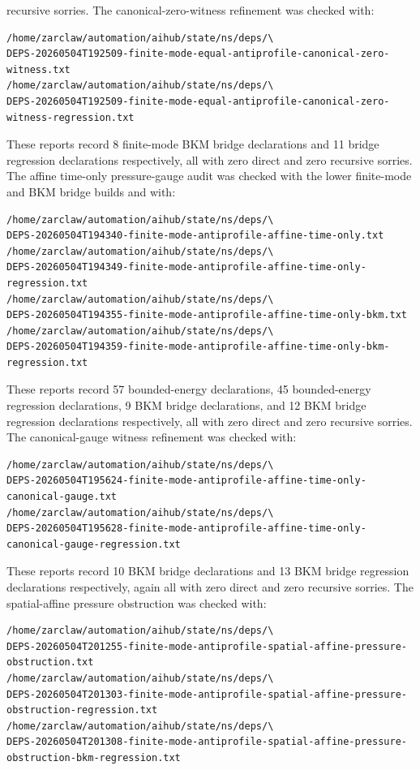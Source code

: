 \documentclass[11pt]{article}
\begin{document}
recursive sorries.
The canonical-zero-witness refinement was checked with:
\begin{verbatim}
/home/zarclaw/automation/aihub/state/ns/deps/\
DEPS-20260504T192509-finite-mode-equal-antiprofile-canonical-zero-witness.txt
/home/zarclaw/automation/aihub/state/ns/deps/\
DEPS-20260504T192509-finite-mode-equal-antiprofile-canonical-zero-witness-regression.txt
\end{verbatim}
These reports record 8 finite-mode BKM bridge declarations and 11 bridge
regression declarations respectively, all with zero direct and zero recursive
sorries.
The affine time-only pressure-gauge audit was checked with the lower
finite-mode and BKM bridge builds and with:
\begin{verbatim}
/home/zarclaw/automation/aihub/state/ns/deps/\
DEPS-20260504T194340-finite-mode-antiprofile-affine-time-only.txt
/home/zarclaw/automation/aihub/state/ns/deps/\
DEPS-20260504T194349-finite-mode-antiprofile-affine-time-only-regression.txt
/home/zarclaw/automation/aihub/state/ns/deps/\
DEPS-20260504T194355-finite-mode-antiprofile-affine-time-only-bkm.txt
/home/zarclaw/automation/aihub/state/ns/deps/\
DEPS-20260504T194359-finite-mode-antiprofile-affine-time-only-bkm-regression.txt
\end{verbatim}
These reports record 57 bounded-energy declarations, 45 bounded-energy
regression declarations, 9 BKM bridge declarations, and 12 BKM bridge
regression declarations respectively, all with zero direct and zero recursive
sorries.
The canonical-gauge witness refinement was checked with:
\begin{verbatim}
/home/zarclaw/automation/aihub/state/ns/deps/\
DEPS-20260504T195624-finite-mode-antiprofile-affine-time-only-canonical-gauge.txt
/home/zarclaw/automation/aihub/state/ns/deps/\
DEPS-20260504T195628-finite-mode-antiprofile-affine-time-only-canonical-gauge-regression.txt
\end{verbatim}
These reports record 10 BKM bridge declarations and 13 BKM bridge regression
declarations respectively, again all with zero direct and zero recursive
sorries.
The spatial-affine pressure obstruction was checked with:
\begin{verbatim}
/home/zarclaw/automation/aihub/state/ns/deps/\
DEPS-20260504T201255-finite-mode-antiprofile-spatial-affine-pressure-obstruction.txt
/home/zarclaw/automation/aihub/state/ns/deps/\
DEPS-20260504T201303-finite-mode-antiprofile-spatial-affine-pressure-obstruction-regression.txt
/home/zarclaw/automation/aihub/state/ns/deps/\
DEPS-20260504T201308-finite-mode-antiprofile-spatial-affine-pressure-obstruction-bkm-regression.txt
\end{verbatim}
\end{document}
